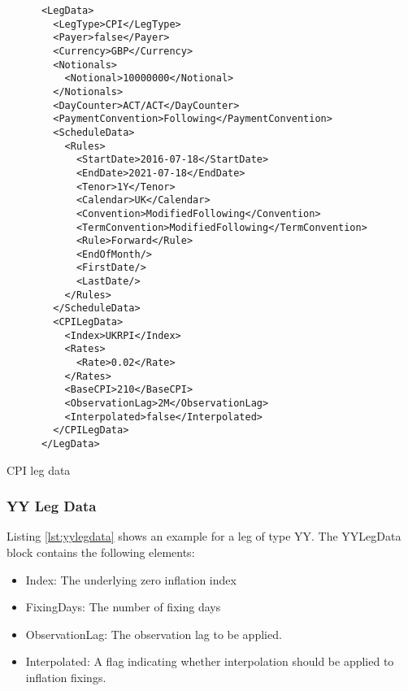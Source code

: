 \begin{listing}[H]
\begin{verbatim}
      <LegData>
        <LegType>CPI</LegType>
        <Payer>false</Payer>
        <Currency>GBP</Currency>
        <Notionals>
          <Notional>10000000</Notional>
        </Notionals>
        <DayCounter>ACT/ACT</DayCounter>
        <PaymentConvention>Following</PaymentConvention>
        <ScheduleData>
          <Rules>
            <StartDate>2016-07-18</StartDate>
            <EndDate>2021-07-18</EndDate>
            <Tenor>1Y</Tenor>
            <Calendar>UK</Calendar>
            <Convention>ModifiedFollowing</Convention>
            <TermConvention>ModifiedFollowing</TermConvention>
            <Rule>Forward</Rule>
            <EndOfMonth/>
            <FirstDate/>
            <LastDate/>
          </Rules>
        </ScheduleData>
        <CPILegData>
          <Index>UKRPI</Index>
          <Rates>
            <Rate>0.02</Rate>
          </Rates>
          <BaseCPI>210</BaseCPI>
          <ObservationLag>2M</ObservationLag>
          <Interpolated>false</Interpolated>
        </CPILegData>
      </LegData>
\end{verbatim}
\caption{CPI leg data}
\label{lst:cpilegdata}
\end{listing}

\subsubsection{YY Leg Data}
\label{ss:yylegdata}

Listing \ref{lst:yylegdata} shows an example for a leg of type YY. The YYLegData block contains the following
elements:

\begin{itemize}
\item Index: The underlying zero inflation index
\item FixingDays: The number of fixing days
\item ObservationLag: The observation lag to be applied.
\item Interpolated: A flag indicating whether interpolation should be applied to inflation fixings.
\end{itemize}

